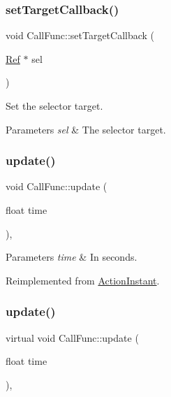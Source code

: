 \subsubsection{\texorpdfstring{set\+Target\+Callback()}{setTargetCallback()}\hspace{0.1cm}{\footnotesize\ttfamily [2/2]}}
{\footnotesize\ttfamily void Call\+Func\+::set\+Target\+Callback (\begin{DoxyParamCaption}\item[{\hyperlink{classRef}{Ref} $\ast$}]{sel }\end{DoxyParamCaption})\hspace{0.3cm}{\ttfamily [inline]}}

Set the selector target.


\begin{DoxyParams}{Parameters}
{\em sel} & The selector target. \\
\hline
\end{DoxyParams}
\mbox{\label{classCallFunc_a935c2f87c96d2a5b9e78b1ca875e9d7a}} 
\subsubsection{\texorpdfstring{update()}{update()}\hspace{0.1cm}{\footnotesize\ttfamily [1/2]}}
{\footnotesize\ttfamily void Call\+Func\+::update (\begin{DoxyParamCaption}\item[{float}]{time }\end{DoxyParamCaption})\hspace{0.3cm}{\ttfamily [override]}, {\ttfamily [virtual]}}


\begin{DoxyParams}{Parameters}
{\em time} & In seconds. \\
\hline
\end{DoxyParams}


Reimplemented from \hyperlink{classActionInstant_a59875bf08cd1f58c0c8c6693ac540ade}{Action\+Instant}.

\mbox{\label{classCallFunc_a6684fe74294f93ba202ae8599e890c0c}} 
\subsubsection{\texorpdfstring{update()}{update()}\hspace{0.1cm}{\footnotesize\ttfamily [2/2]}}
{\footnotesize\ttfamily virtual void Call\+Func\+::update (\begin{DoxyParamCaption}\item[{float}]{time }\end{DoxyParamCaption})\hspace{0.3cm}{\ttfamily [override]}, {\ttfamily [virtual]}}


